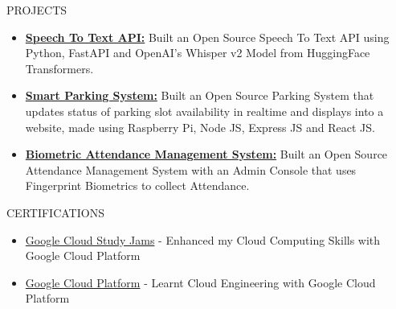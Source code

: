 \documentclass{resume}
\begin{document}
\vspace{-0.4em}
\begin{rSection}{PROJECTS}
  \begin{itemize}
    \item \textbf{\href{https://github.com/Arkapravo-Ghosh/speech-to-text}{Speech To Text API:}} {Built an Open Source Speech To Text API using Python, FastAPI and OpenAI's Whisper v2 Model from HuggingFace Transformers.}
    \item \textbf{\href{https://github.com/Arkapravo-Ghosh/Smart-Parking-System}{Smart Parking System:}} {Built an Open Source Parking System that updates status of parking slot availability in realtime and displays into a website, made using Raspberry Pi, Node JS, Express JS and React JS.}
    \item \textbf{\href{https://github.com/Arkapravo-Ghosh/attendance-monitoring-system}{Biometric Attendance Management System:}} {Built an Open Source Attendance Management System with an Admin Console that uses Fingerprint Biometrics to collect Attendance.}
  \end{itemize}
\end{rSection}
\vspace{-0.4em}
\begin{rSection}{CERTIFICATIONS}
  \begin{itemize}
    \item \href{https://www.cloudskillsboost.google/public_profiles/dcbf7583-1c68-4d5c-a408-9ad45d93130d}{Google Cloud Study Jams} - Enhanced my Cloud Computing Skills with Google Cloud Platform
    \item \href{https://www.cloudskillsboost.google/public_profiles/7594501c-7933-4fba-be9b-2a92ca3ee410}{Google Cloud Platform} - Learnt Cloud Engineering with Google Cloud Platform
  \end{itemize}
\end{rSection}
\end{document}
